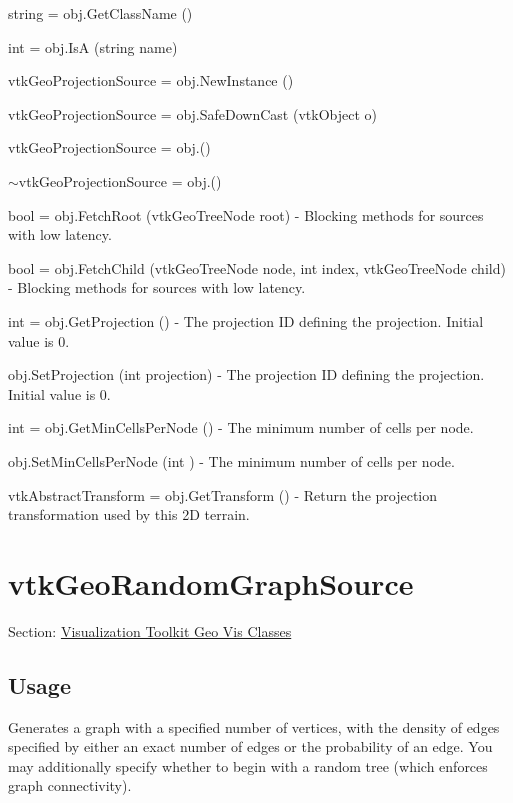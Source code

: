 \begin{DoxyItemize}
\item {\ttfamily string = obj.\-Get\-Class\-Name ()}  
\item {\ttfamily int = obj.\-Is\-A (string name)}  
\item {\ttfamily vtk\-Geo\-Projection\-Source = obj.\-New\-Instance ()}  
\item {\ttfamily vtk\-Geo\-Projection\-Source = obj.\-Safe\-Down\-Cast (vtk\-Object o)}  
\item {\ttfamily vtk\-Geo\-Projection\-Source = obj.()}  
\item {\ttfamily $\sim$vtk\-Geo\-Projection\-Source = obj.()}  
\item {\ttfamily bool = obj.\-Fetch\-Root (vtk\-Geo\-Tree\-Node root)} -\/ Blocking methods for sources with low latency.  
\item {\ttfamily bool = obj.\-Fetch\-Child (vtk\-Geo\-Tree\-Node node, int index, vtk\-Geo\-Tree\-Node child)} -\/ Blocking methods for sources with low latency.  
\item {\ttfamily int = obj.\-Get\-Projection ()} -\/ The projection I\-D defining the projection. Initial value is 0.  
\item {\ttfamily obj.\-Set\-Projection (int projection)} -\/ The projection I\-D defining the projection. Initial value is 0.  
\item {\ttfamily int = obj.\-Get\-Min\-Cells\-Per\-Node ()} -\/ The minimum number of cells per node.  
\item {\ttfamily obj.\-Set\-Min\-Cells\-Per\-Node (int )} -\/ The minimum number of cells per node.  
\item {\ttfamily vtk\-Abstract\-Transform = obj.\-Get\-Transform ()} -\/ Return the projection transformation used by this 2\-D terrain.  
\end{DoxyItemize}\hypertarget{vtkgeovis_vtkgeorandomgraphsource}{}\section{vtk\-Geo\-Random\-Graph\-Source}\label{vtkgeovis_vtkgeorandomgraphsource}
Section\-: \hyperlink{sec_vtkgeovis}{Visualization Toolkit Geo Vis Classes} \hypertarget{vtkwidgets_vtkxyplotwidget_Usage}{}\subsection{Usage}\label{vtkwidgets_vtkxyplotwidget_Usage}
Generates a graph with a specified number of vertices, with the density of edges specified by either an exact number of edges or the probability of an edge. You may additionally specify whether to begin with a random tree (which enforces graph connectivity).

